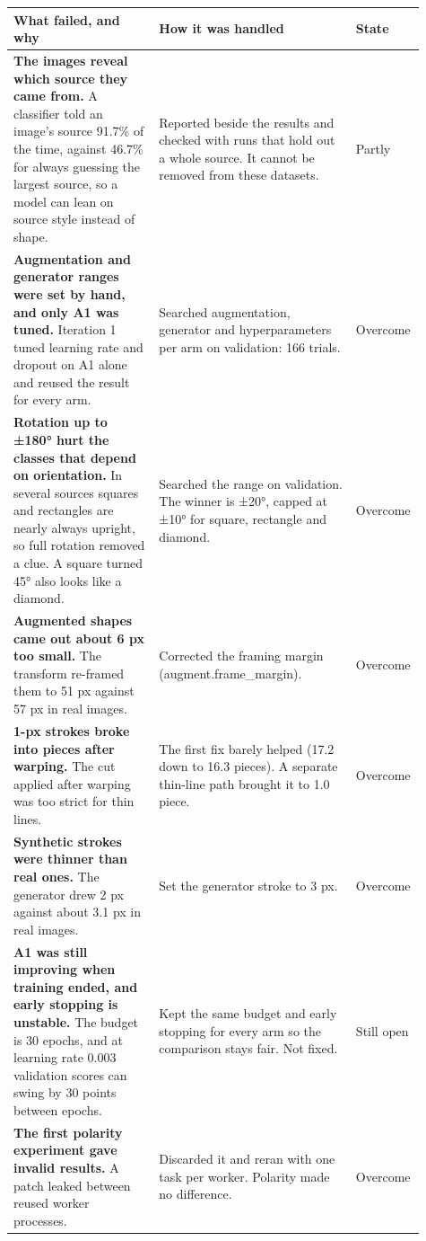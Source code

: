 \begin{tabular}{p{0.34\linewidth}p{0.46\linewidth}p{0.11\linewidth}}
\toprule
What failed, and why & How it was handled & State \\
\midrule
\textbf{The images reveal which source they came from.} A classifier told an image's source 91.7\% of the time, against 46.7\% for always guessing the largest source, so a model can lean on source style instead of shape. & Reported beside the results and checked with runs that hold out a whole source. It cannot be removed from these datasets. & Partly \\
\textbf{Augmentation and generator ranges were set by hand, and only A1 was tuned.} Iteration 1 tuned learning rate and dropout on A1 alone and reused the result for every arm. & Searched augmentation, generator and hyperparameters per arm on validation: 166 trials. & Overcome \\
\textbf{Rotation up to ±180° hurt the classes that depend on orientation.} In several sources squares and rectangles are nearly always upright, so full rotation removed a clue. A square turned 45° also looks like a diamond. & Searched the range on validation. The winner is ±20°, capped at ±10° for square, rectangle and diamond. & Overcome \\
\textbf{Augmented shapes came out about 6 px too small.} The transform re-framed them to 51 px against 57 px in real images. & Corrected the framing margin (augment.frame\_margin). & Overcome \\
\textbf{1-px strokes broke into pieces after warping.} The cut applied after warping was too strict for thin lines. & The first fix barely helped (17.2 down to 16.3 pieces). A separate thin-line path brought it to 1.0 piece. & Overcome \\
\textbf{Synthetic strokes were thinner than real ones.} The generator drew 2 px against about 3.1 px in real images. & Set the generator stroke to 3 px. & Overcome \\
\textbf{A1 was still improving when training ended, and early stopping is unstable.} The budget is 30 epochs, and at learning rate 0.003 validation scores can swing by 30 points between epochs. & Kept the same budget and early stopping for every arm so the comparison stays fair. Not fixed. & Still open \\
\textbf{The first polarity experiment gave invalid results.} A patch leaked between reused worker processes. & Discarded it and reran with one task per worker. Polarity made no difference. & Overcome \\
\bottomrule
\end{tabular}


